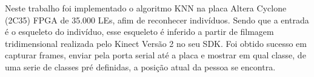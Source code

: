 \begin{resumo}

Neste trabalho foi implementado o algoritmo KNN na placa Altera Cyclone (2C35)
FPGA de 35.000 LEs, afim de reconhecer indivíduos. Sendo que a entrada é o
esqueleto do indivíduo, esse esqueleto é inferido a partir de filmagem 
tridimensional realizada pelo Kinect Versão 2 no seu SDK. Foi obtido sucesso em
capturar frames, enviar pela porta serial até a placa e mostrar em qual classe,
de uma serie de classes pré definidas, a posição atual da pessoa se encontra.

\end{resumo}